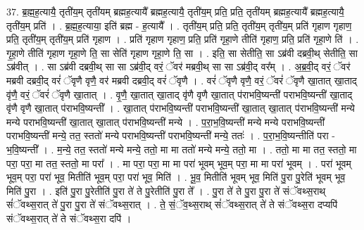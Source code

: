 \documentclass[17pt]{extarticle}
\begin{document}
37. ब्र॒ह्म॒ह॒त्यायै॒ तृती॑य॒म् तृती॑यम् ब्रह्मह॒त्यायै᳚ ब्रह्मह॒त्यायै॒ तृती॑य॒म् प्रति॒ प्रति॒ तृती॑यम् ब्रह्मह॒त्यायै᳚ ब्रह्मह॒त्यायै॒ तृती॑य॒म् प्रति॑ । . ब्र॒ह्म॒ह॒त्याया॒ इति॑ ब्रह्म - ह॒त्यायै᳚ । . तृती॑य॒म् प्रति॒ प्रति॒ तृती॑य॒म् तृती॑य॒म् प्रति॑ गृहाण गृहाण॒ प्रति॒ तृती॑य॒म् तृती॑य॒म् प्रति॑ गृहाण । . प्रति॑ गृहाण गृहाण॒ प्रति॒ प्रति॑ गृहा॒णे तीति॑ गृहाण॒ प्रति॒ प्रति॑ गृहा॒णे ति॑ । . गृ॒हा॒णे तीति॑ गृहाण गृहा॒णे ति॒ सा सेति॑ गृहाण गृहा॒णे ति॒ सा । . इति॒ सा सेतीति॒ सा ऽब्र॑वी दब्रवी॒थ् सेतीति॒ सा ऽब्र॑वीत् । . सा ऽब्र॑वी दब्रवी॒थ् सा सा ऽब्र॑वी॒द् वरं॒ ॅवर॑ मब्रवी॒थ् सा सा ऽब्र॑वी॒द् वर᳚म् । . अ॒ब्र॒वी॒द् वरं॒ ॅवर॑ मब्रवी दब्रवी॒द् वरं॑ ॅवृणै वृणै॒ वर॑ मब्रवी दब्रवी॒द् वरं॑ ॅवृणै । . वरं॑ ॅवृणै वृणै॒ वरं॒ ॅवरं॑ ॅवृणै खा॒तात् खा॒ताद् वृ॑णै॒ वरं॒ ॅवरं॑ ॅवृणै खा॒तात् । . वृ॒णै॒ खा॒तात् खा॒ताद् वृ॑णै वृणै खा॒तात् प॑राभवि॒ष्यन्ती॑ पराभवि॒ष्यन्ती॑ खा॒ताद् वृ॑णै वृणै खा॒तात् प॑राभवि॒ष्यन्ती᳚ । . खा॒तात् प॑राभवि॒ष्यन्ती॑ पराभवि॒ष्यन्ती॑ खा॒तात् खा॒तात् प॑राभवि॒ष्यन्ती॑ मन्ये मन्ये पराभवि॒ष्यन्ती॑ खा॒तात् खा॒तात् प॑राभवि॒ष्यन्ती॑ मन्ये । . प॒रा॒भ॒वि॒ष्यन्ती॑ मन्ये मन्ये पराभवि॒ष्यन्ती॑ पराभवि॒ष्यन्ती॑ मन्ये॒ तत॒ स्ततो॑ मन्ये पराभवि॒ष्यन्ती॑ पराभवि॒ष्यन्ती॑ मन्ये॒ ततः॑ । . प॒रा॒भ॒वि॒ष्यन्तीति॑ परा - भ॒वि॒ष्यन्ती᳚ । . म॒न्ये॒ तत॒ स्ततो॑ मन्ये मन्ये॒ ततो॒ मा मा ततो॑ मन्ये मन्ये॒ ततो॒ मा । . ततो॒ मा मा तत॒ स्ततो॒ मा परा॒ परा॒ मा तत॒ स्ततो॒ मा परा᳚ । . मा परा॒ परा॒ मा मा परा॑ भूवम् भूव॒म् परा॒ मा मा परा॑ भूवम् । . परा॑ भूवम् भूव॒म् परा॒ परा॑ भूव॒ मितीति॑ भूव॒म् परा॒ परा॑ भूव॒ मिति॑ । . भू॒व॒ मितीति॑ भूवम् भूव॒ मिति॑ पु॒रा पु॒रेति॑ भूवम् भूव॒ मिति॑ पु॒रा । . इति॑ पु॒रा पु॒रेतीति॑ पु॒रा ते॑ ते पु॒रेतीति॑ पु॒रा ते᳚ । . पु॒रा ते॑ ते पु॒रा पु॒रा ते॑ संॅवथ्स॒राथ् सं॑ॅवथ्स॒रात् ते॑ पु॒रा पु॒रा ते॑ संॅवथ्स॒रात् । . ते॒ सं॒ॅव॒थ्स॒राथ् सं॑ॅवथ्स॒रात् ते॑ ते संॅवथ्स॒रा दप्यपि॑ संॅवथ्स॒रात् ते॑ ते संॅवथ्स॒रा दपि॑ । \newline
\pagebreak
{}
\end{document}

